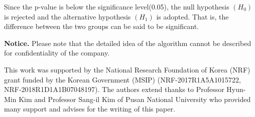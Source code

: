 Since the p-value is below the significance level(0.05), the null hypothesis $(H_{0})$ is rejected and the alternative hypothesis $(H_{1})$ is adopted. That is, the difference between the two groups can be said to be significant.

{\bf Notice.} Please note that the detailed idea of the algorithm cannot be described for confidentiality of the company.

%


\begin{acknowledgements}
This work was supported by the National Research Foundation of Korea (NRF)
grant funded by the Korean Government (MSIP) (NRF-2017R1A5A1015722, NRF-2018R1D1A1B07048197). 
The authors extend thanks to Professor Hyun-Min Kim and Professor Sang-il Kim of Pusan National University who provided many support and advises for the writing of this paper.
\end{acknowledgements}

